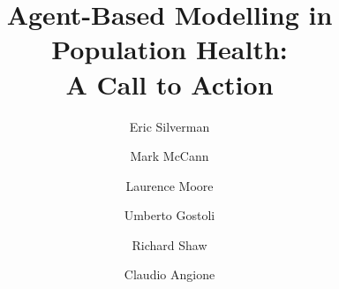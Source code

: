 \documentclass[review]{elsarticle}
\begin{document}
\begin{frontmatter}

\title{Agent-Based Modelling in Population Health:\\ A Call to Action}

\author[mymainaddress]{Eric Silverman}
\author[mymainaddress]{Mark McCann}
\author[mymainaddress]{Laurence Moore}
\author[mymainaddress]{Umberto Gostoli}
\author[mysecondaryaddress]{Richard Shaw}
\author[mytertiaryaddress]{Claudio Angione}







\address[mymainaddress]{MRC/CSO Social and Public Health Sciences Unit, University of Glasgow, 200 Renfield Street, Glasgow G2 3QB, UK}
\address[mysecondaryaddress]{Institute of Health and Wellbeing, University of Glasgow, Glasgow G12 8RZ, UK}
\address[mytertiaryaddress]{Department of Computer Science and Information Systems, Teesside University, Middlesbrough, TS1 3BX, UK}


\end{frontmatter}
\end{document}
